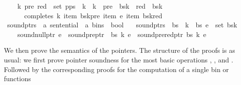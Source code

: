 \begin{isabellebody}
\ \ \ \ {\isacharparenleft}{\kern0pt}k{\isacharprime}{\kern0pt}{\isacharcomma}{\kern0pt}\ pre{\isacharcomma}{\kern0pt}\ red{\isacharparenright}{\kern0pt}\ {\isasymin}\ set\ {\isacharparenleft}{\kern0pt}p{\isacharhash}{\kern0pt}ps{\isacharparenright}{\kern0pt}\ {\isasymlongrightarrow}\ k{\isacharprime}{\kern0pt}\ {\isacharless}{\kern0pt}\ k\ {\isasymand}\ pre\ {\isacharless}{\kern0pt}\ {\isacharbar}{\kern0pt}bs{\isacharbang}{\kern0pt}k{\isacharprime}{\kern0pt}{\isacharbar}{\kern0pt}\ {\isasymand}\ red\ {\isacharless}{\kern0pt}\ {\isacharbar}{\kern0pt}bs{\isacharbang}{\kern0pt}k{\isacharbar}{\kern0pt}\ {\isasymand}\isanewline
\ \ \ \ \ \ completes\ k\ {\isacharparenleft}{\kern0pt}item\ {\isacharparenleft}{\kern0pt}bs{\isacharbang}{\kern0pt}k{\isacharprime}{\kern0pt}{\isacharbang}{\kern0pt}pre{\isacharparenright}{\kern0pt}{\isacharparenright}{\kern0pt}\ {\isacharparenleft}{\kern0pt}item\ e{\isacharparenright}{\kern0pt}\ {\isacharparenleft}{\kern0pt}item\ {\isacharparenleft}{\kern0pt}bs{\isacharbang}{\kern0pt}k{\isacharbang}{\kern0pt}red{\isacharparenright}{\kern0pt}{\isacharparenright}{\kern0pt}{\isachardoublequoteclose}\isanewline
\isanewline
{}\isamarkupfalse%
\ sound{\isacharunderscore}{\kern0pt}ptrs\ {\isacharcolon}{\kern0pt}{\isacharcolon}{\kern0pt}\ {\isachardoublequoteopen}{\isacharprime}{\kern0pt}a\ sentential\ {\isasymRightarrow}\ {\isacharprime}{\kern0pt}a\ bins\ {\isasymRightarrow}\ bool{\isachardoublequoteclose}\ \isanewline
\ \ {\isachardoublequoteopen}sound{\isacharunderscore}{\kern0pt}ptrs\ {\isasymomega}\ bs\ {\isasymequiv}\ {\isasymforall}k\ {\isacharless}{\kern0pt}\ {\isacharbar}{\kern0pt}bs{\isacharbar}{\kern0pt}{\isachardot}{\kern0pt}\ {\isasymforall}e\ {\isasymin}\ set\ {\isacharparenleft}{\kern0pt}bs{\isacharbang}{\kern0pt}k{\isacharparenright}{\kern0pt}{\isachardot}{\kern0pt}\isanewline
\ \ \ \ sound{\isacharunderscore}{\kern0pt}null{\isacharunderscore}{\kern0pt}ptr\ e\ {\isasymand}\ sound{\isacharunderscore}{\kern0pt}pre{\isacharunderscore}{\kern0pt}ptr\ {\isasymomega}\ bs\ k\ e\ {\isasymand}\ sound{\isacharunderscore}{\kern0pt}prered{\isacharunderscore}{\kern0pt}ptr\ bs\ k\ e{\isachardoublequoteclose}%
\begin{isamarkuptext}%
We then prove the semantics of the pointers. The structure of the proofs is as usual: we first
prove pointer soundness for the most basic operations , , and .
Followed by the corresponding proofs for the computation of a single bin or functions 

\end{isamarkuptext}
\end{isabellebody}
